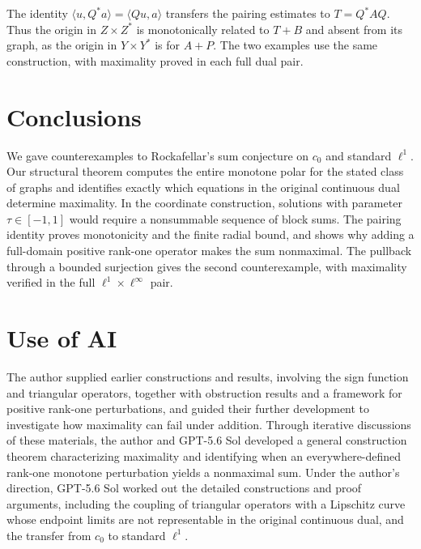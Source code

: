 \documentclass[11pt]{article}
\newcommand{\pair}[2]{\langle #1,#2\rangle}
\theoremstyle{definition}
\theoremstyle{remark}
\begin{document}
The identity $\pair{u}{Q^*a}=\pair{Qu}{a}$ transfers the pairing
estimates to $T=Q^*AQ$. Thus the origin in $Z\times Z^*$ is
monotonically related to $T+B$ and absent from its graph, as the origin
in $Y\times Y^*$ is for $A+P$. The two examples use the same
construction, with maximality proved in each full dual pair.

\section{Conclusions}
\label{sec:conclusion}

We gave counterexamples to Rockafellar's sum conjecture on $c_0$ and
standard $\ell^1$. Our structural theorem computes the entire monotone
polar for the stated class of graphs and identifies exactly which
equations in the original continuous dual determine maximality. In the
coordinate construction, solutions with parameter $\tau\in[-1,1]$
would require a nonsummable sequence of block sums. The pairing identity
proves monotonicity and the finite radial bound, and shows why adding
a full-domain positive rank-one operator makes the sum nonmaximal.
The pullback through a bounded surjection gives the second counterexample,
with maximality verified in the full $\ell^1\times\ell^\infty$ pair.


\section*{Use of AI}
The author supplied earlier constructions and results, involving the sign function and triangular operators, together with obstruction results and a framework for positive rank-one perturbations, and guided their further development to investigate how maximality can fail under addition. Through iterative discussions of these materials, the author and GPT-5.6 Sol developed a general construction theorem characterizing maximality and identifying when an everywhere-defined rank-one monotone perturbation yields a nonmaximal sum.  Under the author's direction, GPT-5.6 Sol worked out the detailed constructions and proof arguments, including the coupling of triangular operators with a Lipschitz curve whose endpoint limits are not representable in the original continuous dual, and the transfer from $c_0$ to standard $\ell^1$. 






\begingroup
\raggedright


\endgroup
\end{document}
